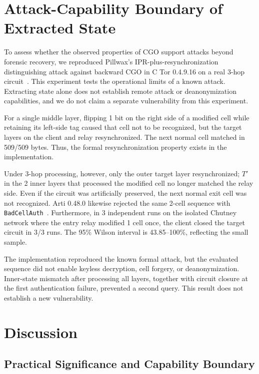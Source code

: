 \documentclass[10pt,a4paper]{article}
\newcommand{\code}[1]{\nolinkurl{#1}}
\begin{document}
\section{Attack-Capability Boundary of Extracted State}\label{sec:security}

To assess whether the observed properties of CGO support attacks beyond forensic recovery, we reproduced Pillwax's IPR-plus-resynchronization distinguishing attack against backward CGO in C Tor 0.4.9.16 on a real 3-hop circuit~\cite{pillwax2026improving}. This experiment tests the operational limits of a known attack. Extracting state alone does not establish remote attack or deanonymization capabilities, and we do not claim a separate vulnerability from this experiment.

For a single middle layer, flipping 1 bit on the right side of a modified cell while retaining its left-side tag caused that cell not to be recognized, but the target layers on the client and relay resynchronized. The next normal cell matched in 509/509 bytes.
Thus, the formal resynchronization property exists in the implementation.

Under 3-hop processing, however, only the outer target layer resynchronized; $T'$ in the 2 inner layers that processed the modified cell no longer matched the relay side. Even if the circuit was artificially preserved, the next normal exit cell was not recognized. Arti 0.48.0 likewise rejected the same 2-cell sequence with \code{BadCellAuth}~\cite{artisource048}.
Furthermore, in 3 independent runs on the isolated Chutney network where the entry relay modified 1 cell once, the client closed the target circuit in 3/3 runs. The 95\% Wilson interval is 43.85--100\%, reflecting the small sample.

The implementation reproduced the known formal attack, but the evaluated sequence did not enable keyless decryption, cell forgery, or deanonymization. Inner-state mismatch after processing all layers, together with circuit closure at the first authentication failure, prevented a second query. This result does not establish a new vulnerability.

\section{Discussion}\label{sec:discussion}

\subsection{Practical Significance and Capability Boundary}
\end{document}
